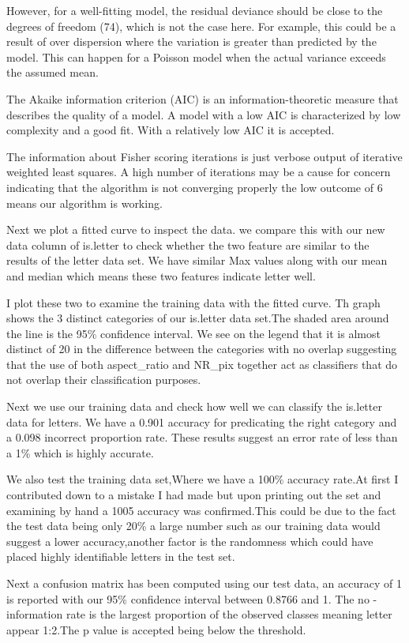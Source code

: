 \documentclass[
]{article}
\begin{document}
However, for a well-fitting model, the residual deviance should be close
to the degrees of freedom (74), which is not the case here. For example,
this could be a result of over dispersion where the variation is greater
than predicted by the model. This can happen for a Poisson model when
the actual variance exceeds the assumed mean.

The Akaike information criterion (AIC) is an information-theoretic
measure that describes the quality of a model. A model with a low AIC is
characterized by low complexity and a good fit. With a relatively low
AIC it is accepted.

The information about Fisher scoring iterations is just verbose output
of iterative weighted least squares. A high number of iterations may be
a cause for concern indicating that the algorithm is not converging
properly the low outcome of 6 means our algorithm is working.

Next we plot a fitted curve to inspect the data. we compare this with
our new data column of is.letter to check whether the two feature are
similar to the results of the letter data set. We have similar Max
values along with our mean and median which means these two features
indicate letter well.

I plot these two to examine the training data with the fitted curve. Th
graph shows the 3 distinct categories of our is.letter data set.The
shaded area around the line is the 95\% confidence interval. We see on
the legend that it is almost distinct of 20 in the difference between
the categories with no overlap suggesting that the use of both
aspect\_ratio and NR\_pix together act as classifiers that do not
overlap their classification purposes.

Next we use our training data and check how well we can classify the
is.letter data for letters. We have a 0.901 accuracy for predicating the
right category and a 0.098 incorrect proportion rate. These results
suggest an error rate of less than a 1\% which is highly accurate.

We also test the training data set,Where we have a 100\% accuracy
rate.At first I contributed down to a mistake I had made but upon
printing out the set and examining by hand a 1005 accuracy was
confirmed.This could be due to the fact the test data being only 20\% a
large number such as our training data would suggest a lower
accuracy,another factor is the randomness which could have placed highly
identifiable letters in the test set.

Next a confusion matrix has been computed using our test data, an
accuracy of 1 is reported with our 95\% confidence interval between
0.8766 and 1. The no - information rate is the largest proportion of the
observed classes meaning letter appear 1:2.The p value is accepted being
below the threshold.
\end{document}
